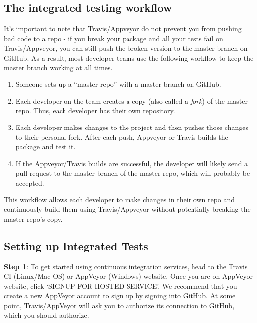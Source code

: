 \documentclass[
]{book}
\providecommand{\tightlist}{%
  \setlength{\itemsep}{0pt}\setlength{\parskip}{0pt}}
\begin{document}
\hypertarget{the-integrated-testing-workflow}{%
\subsection{The integrated testing workflow}\label{the-integrated-testing-workflow}}

It's important to note that Travis/Appveyor do not prevent you from pushing bad code to a repo - if you break your package and all your tests fail on Travis/Appveyor, you can still push the broken version to the master branch on GitHub. As a result, most developer teams use the following workflow to keep the master branch working at all times.

\begin{enumerate}
\def\labelenumi{\arabic{enumi}.}
\tightlist
\item
  Someone sets up a ``master repo'' with a master branch on GitHub.
\item
  Each developer on the team creates a copy (also called a \emph{fork}) of the master repo. Thus, each developer has their own repository.
\item
  Each developer makes changes to the project and then pushes those changes to their personal fork. After each push, Appveyor or Travis builds the package and test it.
\item
  If the Appveyor/Travis builds are successful, the developer will likely send a pull request to the master branch of the master repo, which will probably be accepted.
\end{enumerate}

This workflow allows each developer to make changes in their own repo and continuously build them using Travis/Appveyor without potentially breaking the master repo's copy.

\hypertarget{setting-up-integrated-tests}{%
\subsection{Setting up Integrated Tests}\label{setting-up-integrated-tests}}

\textbf{Step 1}: To get started using continuous integration services, head to the Travis CI (Linux/Mac OS) or AppVeyor (Windows) website. Once you are on AppVeyor website, click `SIGNUP FOR HOSTED SERVICE'. We recommend that you create a new AppVeyor account to sign up by signing into GitHub. At some point, Travis/AppVeyor will ask you to authorize its connection to GitHub, which you should authorize.
\end{document}
